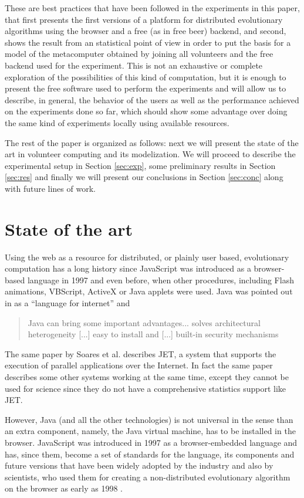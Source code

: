 \documentclass{sig-alternate}
\begin{document}
These are best practices that have been followed in the experiments in
this paper, that first presents the first versions of a platform for
distributed evolutionary algorithms using the browser and a free (as
in free beer) backend, and second, shows the result from an
statistical point of view in order to put the basis for a model of the
metacomputer obtained by joining all volunteers and the free backend
used for the experiment. This is not an exhaustive or complete
exploration of the possibilities of this kind of computation, but it
is enough to present the free software used to perform the experiments
and will allow us to describe, in general, the behavior of the users
as well as the performance achieved on the experiments done so far,
which should show some advantage over doing the same kind of
experiments locally using available resources. 

The rest of the paper is organized as follows: next we will present
the state of the art in volunteer computing and its modelization. We
will proceed to describe the experimental setup in Section
\ref{sec:exp}, some preliminary results in Section \ref{sec:res} and
finally we will present our conclusions in Section \ref{sec:conc}
along with future lines of work. 

\section{State of the art}
\label{sec:soa}

Using the web as a resource for distributed, or plainly user based,
evolutionary computation has a long history since JavaScript was
introduced as a browser-based language in 1997 and even before, when
other procedures, including Flash animations, VBScript, ActiveX or Java applets were
used. Java was pointed out in \cite{soares1998get} as a ``language for
internet'' and
\begin{quote}
Java can bring some important advantages... solves architectural
heterogeneity [...] easy to install and [...] built-in security
mechanisms
\end{quote}
The same paper by Soares et al. describes JET, a system that supports
the execution of parallel applications over the Internet. In fact the
same paper describes some other systems working at the same time,
except they cannot be used for science since they do not have a
comprehensive statistics support like JET. 

However, Java (and all the other technologies) is not universal in the
sense than an extra component, namely, the Java virtual machine, has
to be installed in the browser. JavaScript
\cite{flanagan2006javascript} was introduced in 1997 as a
browser-embedded language and has, since them, become a set of standards
\cite{ECMA-262} for the language, its components and future versions
that have been widely adopted by the industry and also by scientists,
who used them for creating a non-distributed evolutionary algorithm on
the browser as early as 1998 \cite{jj-ppsn98}. 
\end{document}
